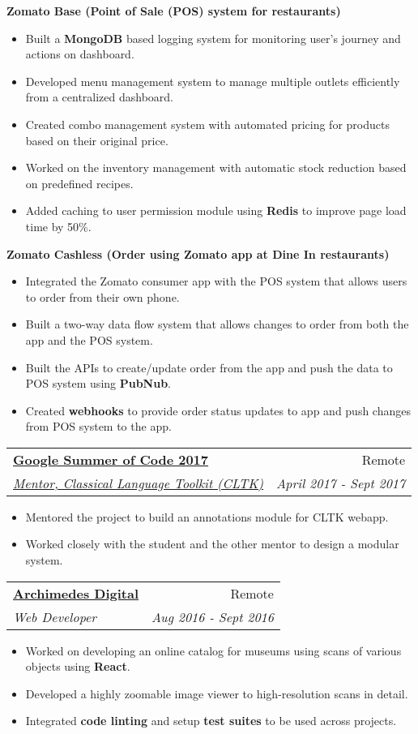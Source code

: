 \documentclass[letterpaper,11pt]{article}
\makeatletter
\newcommand{\resumeItemNoBold}[1]{
  \item\small{
    {#1 \vspace{-2pt}}
  }
}
\newcommand{\resumeSubheading}[4]{
  \vspace{-1pt}\item
    \begin{tabular*}{0.97\textwidth}{l@{\extracolsep{\fill}}r}
      \textbf{#1} & #2 \\
      \textit{\small#3} & \textit{\small #4} \\
    \end{tabular*}\vspace{-5pt}
}
\newcommand{\resumeItemListStart}{\begin{itemize}}
\newcommand{\resumeItemListEnd}{\end{itemize}\vspace{-5pt}}
\newcommand{\resumeItemListHeading}[1]{\textbf{#1}\vspace{-5pt}}
\makeatother
\begin{document}
      \resumeItemListHeading{Zomato Base (Point of Sale (POS) system for restaurants)}
      \resumeItemListStart
          \resumeItemNoBold
          {Built a \textbf{MongoDB} based logging system for monitoring user's journey and actions on dashboard.}
          \resumeItemNoBold
          {Developed menu management system to manage multiple outlets efficiently from a centralized dashboard.}
          \resumeItemNoBold
          {Created combo management system with automated pricing for products based on their original price.}
          \resumeItemNoBold
          {Worked on the inventory management with automatic stock reduction based on predefined recipes.}
          \resumeItemNoBold
          {Added caching to user permission module using \textbf{Redis} to improve page load time by 50\%.}
      \resumeItemListEnd
      
      \resumeItemListHeading{Zomato Cashless (Order using Zomato app at Dine In restaurants)}
      \resumeItemListStart
          \resumeItemNoBold
          {Integrated the Zomato consumer app with the POS system that allows users to order from their own phone.}
          \resumeItemNoBold
          {Built a two-way data flow system that allows changes to order from both the app and the POS system.}
          \resumeItemNoBold
          {Built the APIs to create/update order from the app and push the data to POS system using \textbf{PubNub}.}
          \resumeItemNoBold
          {Created \textbf{webhooks} to provide order status updates to app and push changes from POS system to the app.}
      \resumeItemListEnd
      
      \resumeSubheading
      {\href{https://summerofcode.withgoogle.com/archive/2017/projects/6041859612737536/}{\underline{Google Summer of Code 2017}}}{Remote}
      {\href{http://cltk.org/}{Mentor, Classical Language Toolkit (CLTK)}}{April 2017 - Sept 2017}
      \resumeItemListStart
          \resumeItemNoBold
          {Mentored the project to build an annotations module for CLTK webapp.}
          \resumeItemNoBold
          {Worked closely with the student and the other mentor to design a modular system.}
      \resumeItemListEnd
      
	\resumeSubheading
      {\href{https://archimedes.digital}{\underline{Archimedes Digital}}}{Remote}
      {Web Developer}{Aug 2016 - Sept 2016}
      \resumeItemListStart
        \resumeItemNoBold
          {Worked on developing an online catalog for museums using scans of various objects using \textbf{React}.}
        \resumeItemNoBold
          {Developed a highly zoomable image viewer to high-resolution scans in detail.}
        \resumeItemNoBold
          {Integrated \textbf{code linting} and setup \textbf{test suites} to be used across projects.}
      \resumeItemListEnd
\end{document}
